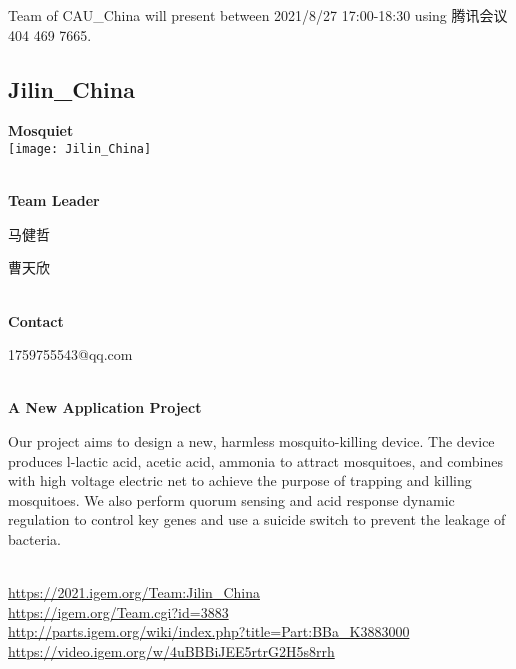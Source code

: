 \vfill{}









Team of CAU\_China will present between   2021/8/27 17:00-18:30      using 腾讯会议 404 469 7665.
\newpage


\subsection{\textcolor{Blu}{ Jilin\_China } }
\vspace{5mm}
\begin{center}
\large{
  \textbf{ Mosquiet }\\

  \texttt{[image: Jilin\_China]}
}
\end{center}
\textbf{\\Team Leader}

  马健哲

  曹天欣


\textbf{\\Contact}

  1759755543@qq.com


\textbf{\\A New Application Project\\}\begin{spacing}{1.5}

Our project aims to design a new, harmless mosquito-killing device. The device produces l-lactic acid, acetic acid, ammonia to attract mosquitoes, and combines with high voltage electric net to achieve the purpose of trapping and killing mosquitoes. We also perform quorum sensing and acid response dynamic regulation to control key genes and use a suicide switch to prevent the leakage of bacteria.\end{spacing}
\\

\url{https://2021.igem.org/Team:Jilin\_China }\\
\url{https://igem.org/Team.cgi?id=3883 }\\
\url{http://parts.igem.org/wiki/index.php?title=Part:BBa_K3883000 }\\
\url{https://video.igem.org/w/4uBBBiJEE5rtrG2H5s8rrh }\\

\vfill{}









